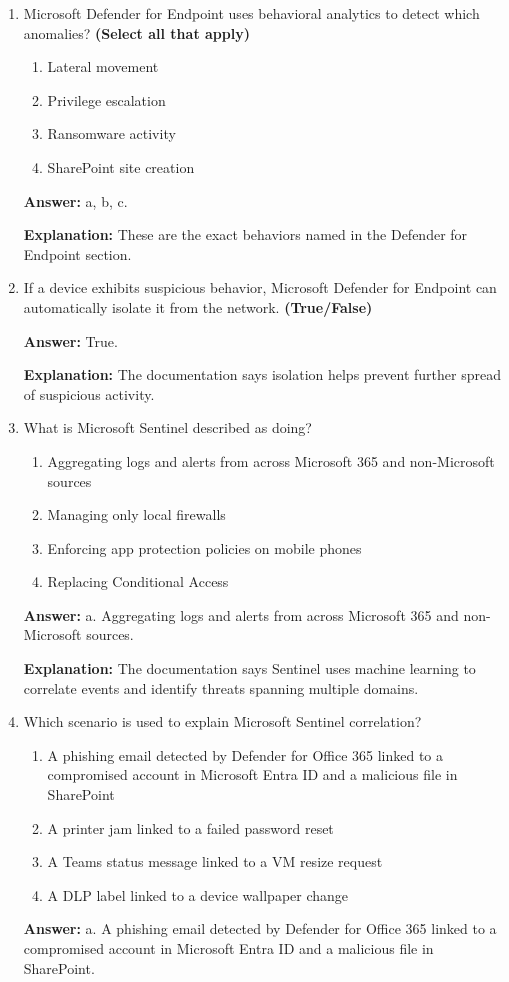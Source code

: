 \documentclass[10pt]{article}
\begin{document}
\begin{enumerate}[leftmargin=*]
\item Microsoft Defender for Endpoint uses behavioral analytics to detect which anomalies? \textbf{(Select all that apply)}
\begin{enumerate}[label=\alph*., leftmargin=1.5em]
\item Lateral movement
\item Privilege escalation
\item Ransomware activity
\item SharePoint site creation
\end{enumerate}
\textbf{Answer:} a, b, c.

\textbf{Explanation:} These are the exact behaviors named in the Defender for Endpoint section.

\item If a device exhibits suspicious behavior, Microsoft Defender for Endpoint can automatically isolate it from the network. \textbf{(True/False)}

\textbf{Answer:} True.

\textbf{Explanation:} The documentation says isolation helps prevent further spread of suspicious activity.

\item What is Microsoft Sentinel described as doing?
\begin{enumerate}[label=\alph*., leftmargin=1.5em]
\item Aggregating logs and alerts from across Microsoft 365 and non-Microsoft sources
\item Managing only local firewalls
\item Enforcing app protection policies on mobile phones
\item Replacing Conditional Access
\end{enumerate}
\textbf{Answer:} a. Aggregating logs and alerts from across Microsoft 365 and non-Microsoft sources.

\textbf{Explanation:} The documentation says Sentinel uses machine learning to correlate events and identify threats spanning multiple domains.

\item Which scenario is used to explain Microsoft Sentinel correlation?
\begin{enumerate}[label=\alph*., leftmargin=1.5em]
\item A phishing email detected by Defender for Office 365 linked to a compromised account in Microsoft Entra ID and a malicious file in SharePoint
\item A printer jam linked to a failed password reset
\item A Teams status message linked to a VM resize request
\item A DLP label linked to a device wallpaper change
\end{enumerate}
\textbf{Answer:} a. A phishing email detected by Defender for Office 365 linked to a compromised account in Microsoft Entra ID and a malicious file in SharePoint.


\end{enumerate}
\end{document}
